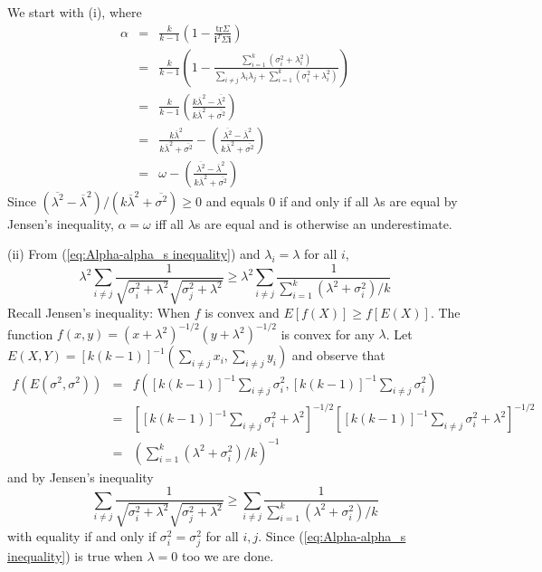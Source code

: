 \documentclass{article}
\makeatletter
\theoremstyle{plain}
\theoremstyle{plain}
\theoremstyle{definition}
\theoremstyle{remark}
\theoremstyle{definition}
\theoremstyle{plain}
\theoremstyle{plain}
\theoremstyle{definition}
\newenvironment{proof}[1][\protect\proofname]{\par
	\normalfont\topsep6\p@\@plus6\p@\relax
	\trivlist
	\itemindent\parindent
	\item[\hskip\labelsep\scshape #1]\ignorespaces
}{%
	\endtrivlist\@endpefalse
}
\providecommand{\proofname}{Proof}
\makeatother
\begin{document}
\begin{proof}[Proof of Proposition \ref{prop:Reliabilities.}]\label{proof:Reliabilities.}
We start with (i), where
\begin{eqnarray*}
\alpha & = & \frac{k}{k-1}\left(1-\frac{\textrm{tr}\Sigma}{\mathbf{i}^{T}\Sigma\mathbf{i}}\right)\\
 & = & \frac{k}{k-1}\left(1-\frac{\sum_{i=1}^{k}\left(\sigma_{i}^{2}+\lambda_{i}^{2}\right)}{\sum_{i\neq j}\lambda_{i}\lambda_{j}+\sum_{i=1}^{k}\left(\sigma_{i}^{2}+\lambda_{i}^{2}\right)}\right)\\
 & = & \frac{k}{k-1}\left(\frac{k\overline{\lambda}^{2}-\overline{\lambda^{2}}}{k\overline{\lambda}^{2}+\overline{\sigma^{2}}}\right)\\
 & = & \frac{k\overline{\lambda}^{2}}{k\overline{\lambda}^{2}+\overline{\sigma^{2}}}-\left(\frac{\overline{\lambda^{2}}-\overline{\lambda}^{2}}{k\overline{\lambda}^{2}+\overline{\sigma^{2}}}\right)\\
 & = & \omega-\left(\frac{\overline{\lambda^{2}}-\overline{\lambda}^{2}}{k\overline{\lambda}^{2}+\overline{\sigma^{2}}}\right)
\end{eqnarray*}
Since $(\overline{\lambda^{2}}-\overline{\lambda}^{2})/(k\overline{\lambda}^{2}+\overline{\sigma^{2}})\geq0$
and equals $0$ if and only if all $\lambda$s are equal by Jensen's inequality, $\alpha=\omega$
iff all $\lambda$s are equal and is otherwise an underestimate.

(ii) From (\ref{eq:Alpha-alpha_s inequality}) and $\lambda_{i}=\lambda$
for all $i$,
\[
\lambda^{2}\sum_{i\neq j}\frac{1}{\sqrt{\sigma_{i}^{2}+\lambda^{2}}\sqrt{\sigma_{j}^{2}+\lambda^{2}}}\geq\lambda^{2}\sum_{i\neq j}\frac{1}{\sum_{i=1}^{k}\left(\lambda^{2}+\sigma_{i}^{2}\right)/k}
\]
Recall Jensen's inequality: When $f$ is convex and $E\left[f\left(X\right)\right]\geq f\left[E\left(X\right)\right]$.
The function $f\left(x,y\right)=\left(x+\lambda^{2}\right)^{-1/2}\left(y+\lambda^{2}\right)^{-1/2}$
is convex for any $\lambda$. Let $E\left(X,Y\right)=\left[k\left(k-1\right)\right]^{-1}\left(\sum_{i\neq j}x_{i},\sum_{i\neq j}y_{i}\right)$
and observe that
\begin{eqnarray*}
f\left(E\left(\sigma^{2},\sigma^{2}\right)\right) & = & f\left(\left[k\left(k-1\right)\right]^{-1}\sum_{i\neq j}\sigma_{i}^{2},\left[k\left(k-1\right)\right]^{-1}\sum_{i\neq j}\sigma_{i}^{2}\right)\\
 & = & \left[\left[k\left(k-1\right)\right]^{-1}\sum_{i\neq j}\sigma_{i}^{2}+\lambda^{2}\right]^{-1/2}\left[\left[k\left(k-1\right)\right]^{-1}\sum_{i\neq j}\sigma_{i}^{2}+\lambda^{2}\right]^{-1/2}\\
 & = & \left(\sum_{i=1}^{k}\left(\lambda^{2}+\sigma_{i}^{2}\right)/k\right)^{-1}
\end{eqnarray*}
and by Jensen's inequality
\[
\sum_{i\neq j}\frac{1}{\sqrt{\sigma_{i}^{2}+\lambda^{2}}\sqrt{\sigma_{j}^{2}+\lambda^{2}}}\geq\sum_{i\neq j}\frac{1}{\sum_{i=1}^{k}\left(\lambda^{2}+\sigma_{i}^{2}\right)/k}
\]
with equality if and only if $\sigma_{i}^{2}=\sigma_{j}^{2}$ for
all $i,j$. Since (\ref{eq:Alpha-alpha_s inequality}) is true when
$\lambda=0$ too we are done.


\end{proof}
\end{document}
